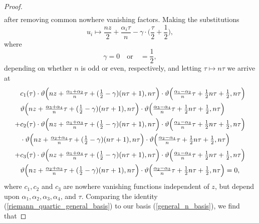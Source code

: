 \begin{proof}
\begin{equation}
\begin{split}
	\end{split}
	\end{equation}
	after removing common nowhere vanishing factors.
	Making the substitutions
	\begin{equation*}
		u_{i}\longmapsto \frac{nz}{2} + \frac{\alpha_{i} \tau}{n} - \gamma\cdot\bigg(\frac{\tau}{2} + \frac{1}{2}\bigg),
	\end{equation*}
	where 
	\begin{equation*}
		\gamma = 0 \quad\text{or}\quad=\frac{1}{2},
	\end{equation*}
	depending on whether $n$ is odd or even, respectively, and letting $\tau \mapsto n\tau$ we arrive at
	\begin{equation}
	\label{riemann_quartic_general_basis}
	\begin{split}
	& c_{1}(\tau)\cdot\vartheta\Big(nz + \tfrac{\alpha_{1} + \alpha_{2}}{n}\tau + (\tfrac{1}{2} - \gamma)(n\tau + 1),n\tau\Big)\cdot\vartheta\Big(\tfrac{\alpha_{1} - \alpha_{2}}{n}\tau + \tfrac{1}{2}n\tau + \tfrac{1}{2},n\tau\Big)\\
	&\vartheta\Big(nz + \tfrac{\alpha_{3} + \alpha_{4}}{n}\tau + (\tfrac{1}{2} - \gamma)(n\tau + 1),n\tau\Big)
	\cdot\vartheta\Big(\tfrac{\alpha_{3} - \alpha_{4}}{n}\tau + \tfrac{1}{2}n\tau + \tfrac{1}{2},n\tau\Big)\\
	+&c_{2}(\tau)\cdot\vartheta\Big(nz + \tfrac{\alpha_{1} + \alpha_{3}}{n}\tau + (\tfrac{1}{2} - \gamma)(n\tau + 1),n\tau\Big)\cdot\vartheta\Big(\tfrac{\alpha_{1} - \alpha_{3}}{n}\tau + \tfrac{1}{2}n\tau + \tfrac{1}{2},n\tau\Big)\\
	&\cdot\vartheta\Big(nz + \tfrac{\alpha_{2} + \alpha_{4}}{n}\tau + (\tfrac{1}{2} - \gamma)(n\tau + 1),n\tau\Big)
	\cdot\vartheta\Big(\tfrac{\alpha_{2} - \alpha_{4}}{n}\tau + \tfrac{1}{2}n\tau + \tfrac{1}{2},n\tau\Big)\\
	+&c_{3}(\tau)\cdot\vartheta\Big(nz + \tfrac{\alpha_{1} + \alpha_{4}}{n}\tau + (\tfrac{1}{2} - \gamma)(n\tau + 1),n\tau\Big)\cdot\vartheta\Big(\tfrac{\alpha_{1} - \alpha_{4}}{n}\tau + \tfrac{1}{2}n\tau + \tfrac{1}{2},n\tau\Big)\\
	&\vartheta\Big(nz + \tfrac{\alpha_{2} + \alpha_{3}}{n}\tau + (\tfrac{1}{2} - \gamma)(n\tau + 1),n\tau\Big)\cdot\vartheta\Big(\tfrac{\alpha_{2} - \alpha_{3}}{n}\tau + \tfrac{1}{2}n\tau + \tfrac{1}{2},n\tau\Big) = 0,
	\end{split}
	\end{equation}
	where $c_{1},c_{2}$ and $c_{3}$ are nowhere vanishing functions independent of $z$, but depend upon $\alpha_{1}, \alpha_{2}, \alpha_{3}, \alpha_{4}$, and $\tau$. Comparing the identity (\ref{riemann_quartic_general_basis}) to our basis (\ref{general_n_basis}), we find that

\end{proof}
